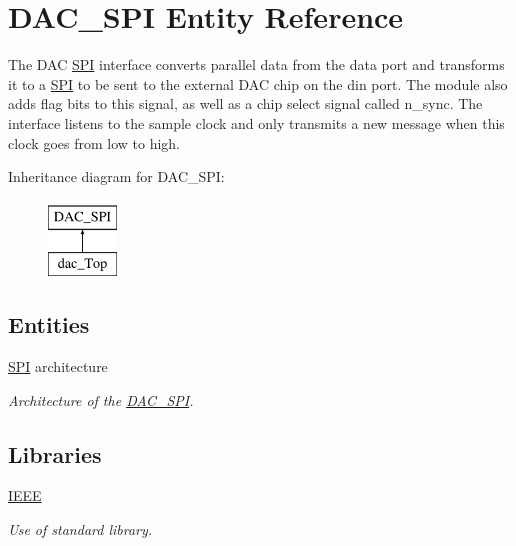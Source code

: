 \hypertarget{classDAC__SPI}{\section{D\-A\-C\-\_\-\-S\-P\-I Entity Reference}
\label{classDAC__SPI}
}


The D\-A\-C \hyperlink{classDAC__SPI_1_1SPI}{S\-P\-I} interface converts parallel data from the data port and transforms it to a \hyperlink{classDAC__SPI_1_1SPI}{S\-P\-I} to be sent to the external D\-A\-C chip on the din port. The module also adds flag bits to this signal, as well as a chip select signal called n\-\_\-sync. The interface listens to the sample clock and only transmits a new message when this clock goes from low to high.  


Inheritance diagram for D\-A\-C\-\_\-\-S\-P\-I\-:\begin{figure}[H]
\begin{center}
\leavevmode
\includegraphics[height=2.000000cm]{classDAC__SPI}
\end{center}
\end{figure}
\subsection*{Entities}
\begin{DoxyCompactItemize}
\item 
\hyperlink{classDAC__SPI_1_1SPI}{S\-P\-I} architecture
\begin{DoxyCompactList}\small\item\em Architecture of the \hyperlink{classDAC__SPI}{D\-A\-C\-\_\-\-S\-P\-I}. \end{DoxyCompactList}\end{DoxyCompactItemize}
\subsection*{Libraries}
 \begin{DoxyCompactItemize}
\item 
\hypertarget{classDAC__SPI_ae4f03c286607f3181e16b9aa12d0c6d4}{\hyperlink{classDAC__SPI_ae4f03c286607f3181e16b9aa12d0c6d4}{I\-E\-E\-E} }\label{classDAC__SPI_ae4f03c286607f3181e16b9aa12d0c6d4}

\begin{DoxyCompactList}\small\item\em Use of standard library. \end{DoxyCompactList}\end{DoxyCompactItemize}

